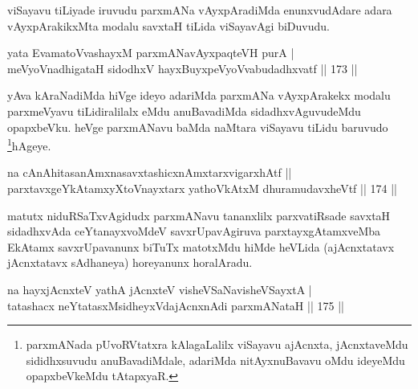 \begin{artha}
viSayavu tiLiyade iruvudu parxmANa vAyxpAradiMda enunxvudAdare adara vAyxpArakikxMta modalu savxtaH tiLida viSayavAgi biDuvudu.
\end{artha}

\begin{shl}
yata EvamatoV\s vashayxM parxmANavAyxpaqteVH purA | \\
meVyoV\s nadhigataH sidodhxV hayxBuyxpeVyoV\s vabudadhxvatf \hfill||  173 ||  
\end{shl}

\begin{artha}
yAva kAraNadiMda hiVge ideyo adariMda parxmANa vAyxpArakekx modalu parxmeVyavu tiLidiralilalx eMdu anuBavadiMda sidadhxvAguvudeMdu opapxbeVku. heVge parxmANavu baMda naMtara viSayavu tiLidu baruvudo \footnote{parxmANada pUvoRVtatxra kAlagaLalilx viSayavu ajAcnxta, jAcnxtaveMdu sididhxsuvudu anuBavadiMdale, adariMda nitAyxnuBavavu oMdu ideyeMdu opapxbeVkeMdu tAtapxyaR.}hAgeye.
\end{artha}


\begin{shl}
na \footnotemark{}cAnAhitasanAmxnasavxtashicxnAmxtarxvigarxhAtf ||  \\
parxtavxgeYkAtamxyXtoV\s nayxtarx yathoVkAtxM dhuramudavxheVtf \hfill||  174 ||  
\end{shl}

\begin{artha}
matutx niduRSaTxvAgidudx parxmANavu tananxlilx parxvatiRsade savxtaH sidadhxvAda ceYtanayxvoMdeV savxrUpavAgiruva parxtayxgAtamxveMba EkAtamx savxrUpavanunx biTuTx matotxMdu hiMde heVLida (ajAcnxtatavx jAcnxtatavx sAdhaneya) horeyanunx horalAradu.
\end{artha}

\begin{shl}
na hayxjAcnxteV yathA jAcnxteV visheVSaNavisheVSayxtA | \\
tatashacx neYtatasxMsidheyxVdajAcnxnAdi parxmANataH \hfill||  175 ||  
\end{shl}

